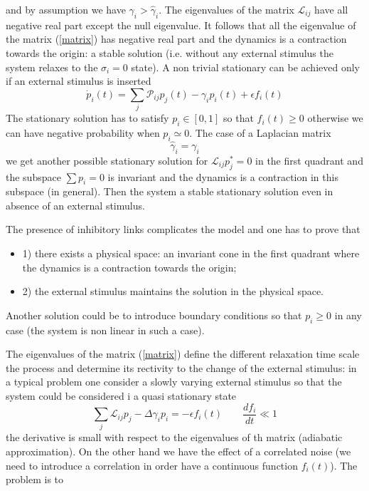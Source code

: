 and by assumption we have $\gamma_i>\hat \gamma_i$. The eigenvalues of the matrix $\mathcal{L}_{ij}$
have all negative real part except the null eigenvalue. It follows that all the eigenvalue of the matrix (\ref{matrix})
has negative real part and the dynamics is a contraction towards the origin:
a stable solution (i.e. without any external stimulus the system relaxes to the $\sigma_i=0$ state).
A non trivial stationary can be achieved only if an external stimulus is inserted
\begin{equation}
\dot p_i(t)=\sum_j \mathcal{P}_{ij}p_j(t)-\gamma_i p_i(t)+\epsilon f_i(t)
\label{average_ext}
\end{equation}
The stationary solution has to satisfy $p_i\in [0,1]$ so that $f_i(t)\ge 0$ otherwise we can have negative probability 
when $p_i\simeq 0$. The case of a Laplacian matrix
$$
\hat \gamma_i=\gamma_i
$$
we get another possible stationary solution for $\mathcal{L}_{ij}p^\ast_j=0$ in the first quadrant and
the subspace $\sum p_i=0$ is invariant and the dynamics is a contraction in this subspace (in general).
Then the system a stable stationary solution even in absence of an external stimulus.\par\noindent
The presence of inhibitory links complicates the model and one has to prove that
\begin{itemize}
\item 1) there exists a physical space: an invariant cone in the first quadrant where the dynamics is a contraction towards
the origin;\par
\item 2) the external stimulus maintains the solution in the physical space.
\end{itemize}
Another solution could be to introduce boundary conditions so that $p_i\ge 0$ in any case (the system is non linear in such a case).
\par\noindent
The eigenvalues of the matrix (\ref{matrix}) define the different relaxation time scale the process and determine its rectivity
to the change of the external stimulus: in a typical problem one consider a slowly varying external stimulus so that the
system could be considered i a quasi stationary state
$$
\sum_j \mathcal{L}_{ij}p_j-\Delta \gamma_i p_i=-\epsilon f_i(t) \qquad \frac{df_i}{dt}\ll 1
$$
the derivative is small with respect to the eigenvalues of th matrix (adiabatic approximation). On the other hand we have the effect
of a correlated noise (we need to introduce a correlation in order have a continuous function $f_i(t)$). The problem is to

